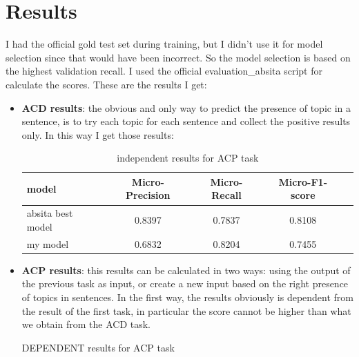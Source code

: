\documentclass{article}
\begin{document}
    \section{Results}\label{sec:s5}
        I had the official gold test set during training, but I didn't use it for model selection since that would have been incorrect.
        So the model selection is based on the highest validation recall.
        I used the official evaluation\_absita script for calculate the scores.
        These are the results I get:
        \begin{itemize}
            \item \textbf{ACD results}: the obvious and only way to predict the presence of topic in a sentence, is to try each topic for each sentence and collect the positive results only.
                In this way I get those results:
                \begin{table}[h!]
                    \begin{center}
                        \caption{independent results for ACP task}
                        \label{tab:table2}
                        \begin{tabular}{l|c|c|c|r}
                            \textbf{model} & \textbf{Micro-Precision} & \textbf{Micro-Recall} & \textbf{Micro-F1-score}\\
                            \hline
                                absita best model & 0.8397 & 0.7837 & 0.8108\\
                                my model & 0.6832 & 0.8204 & 0.7455\\
                        \end{tabular}
                    \end{center}
                \end{table}
            \item \textbf{ACP results}: this results can be calculated in two ways: using the output of the previous task as input, or create a new input based on the right presence of topics in sentences.
                In the first way, the results obviously is dependent from the result of the first task, in particular the score cannot be higher than what we obtain from the ACD task.
                \begin{table}[h!]
                    \begin{center}
                        \caption{DEPENDENT results for ACP task}
                        \label{tab:table3}

\end{center}
\end{table}
\end{itemize}
\end{document}
